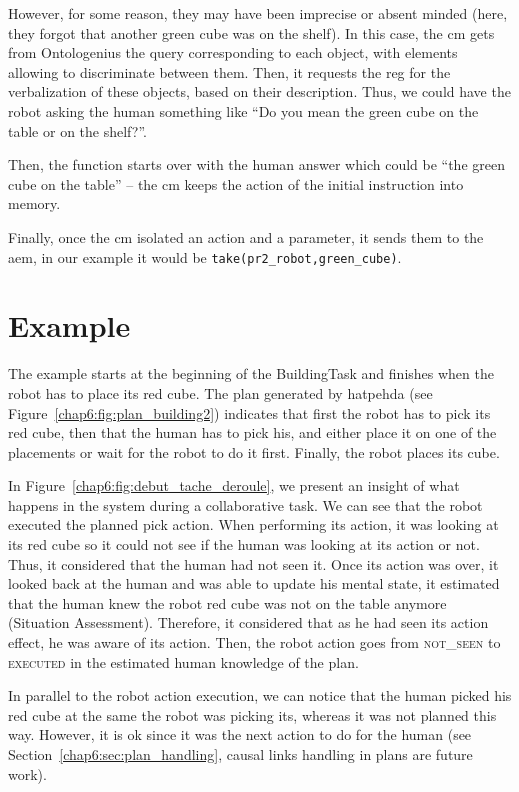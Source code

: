 \documentclass[a4paper,11pt,twoside]{StyleThese}
\begin{document}
However, for some reason, they may have been imprecise or absent minded (\eg here, they forgot that another green cube was on the shelf). In this case, the \acrshort{cm} gets from Ontologenius the \sparql{} query corresponding to each object, with elements allowing to discriminate between them. Then, it requests the \acrshort{reg} for the verbalization of these objects, based on their \sparql{} description. Thus, we could have the robot asking the human something like ``Do you mean the green cube on the table or on the shelf?''. 

Then, the function starts over with the human answer which could be ``the green cube on the table'' -- the \acrshort{cm} keeps the action of the initial instruction into memory.

Finally, once the \acrshort{cm} isolated an action and a parameter, it sends them to the \acrlong{aem}, in our example it would be \verb'take(pr2_robot,green_cube)'.

\section{Example}
\thispagestyle{example}
The example starts at the beginning of the BuildingTask and finishes when the robot has to place its red cube. The plan generated by \acrshort{hatpehda} (see Figure~\ref{chap6:fig:plan_building2}) indicates that first the robot has to pick its red cube, then that the human has to pick his, and either place it on one of the placements or wait for the robot to do it first. Finally, the robot places its cube. 

In Figure~\ref{chap6:fig:debut_tache_deroule}, we present an insight of what happens in the system during a collaborative task. We can see that the robot executed the planned pick action. When performing its action, it was looking at its red cube so it could not see if the human was looking at its action or not. Thus, it considered that the human had not seen it. Once its action was over, it looked back at the human and was able to update his mental state, \ie it estimated that the human knew the robot red cube was not on the table anymore (Situation Assessment). Therefore, it considered that as he had seen its action effect, he was aware of its action. Then, the robot action goes from \textsc{not\_seen} to \textsc{executed} in the estimated human knowledge of the plan. 

In parallel to the robot action execution, we can notice that the human picked his red cube at the same the robot was picking its, whereas it was not planned this way. However, it is ok since it was the next action to do for the human (see Section~\ref{chap6:sec:plan_handling}, causal links handling in plans are future work). 
\end{document}
